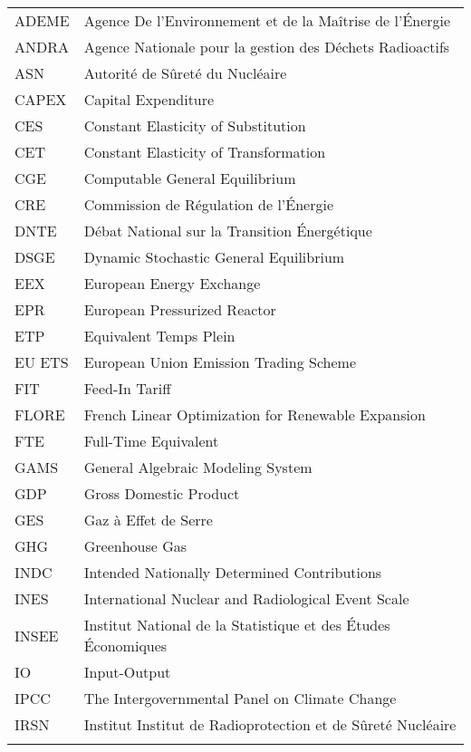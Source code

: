 \begin{tabular}{ p{} p{} }

ADEME & Agence De l'Environnement et de la Maîtrise de l'Énergie \\
ANDRA & Agence Nationale pour la gestion des Déchets Radioactifs \\
ASN & Autorité de Sûreté du Nucléaire \\
CAPEX & Capital Expenditure \\
CES & Constant Elasticity of Substitution \\
CET & Constant Elasticity of Transformation \\
CGE & Computable General Equilibrium \\
CRE & Commission de Régulation de l'Énergie \\
DNTE & Débat National sur la Transition Énergétique \\
DSGE & Dynamic Stochastic General Equilibrium \\
EEX & European Energy Exchange \\
EPR & European Pressurized Reactor \\
ETP & Equivalent Temps Plein \\
EU ETS & European Union Emission Trading Scheme \\
FIT & Feed-In Tariff \\
FLORE & French Linear Optimization for Renewable Expansion \\
FTE & Full-Time Equivalent \\
GAMS & General Algebraic Modeling System \\
GDP & Gross Domestic Product \\
GES & Gaz à Effet de Serre \\
GHG & Greenhouse Gas \\
INDC & Intended Nationally Determined Contributions \\
INES &  International Nuclear and Radiological Event Scale \\
INSEE & Institut National de la Statistique et des Études Économiques \\
IO & Input-Output \\
IPCC & The Intergovernmental Panel on Climate Change \\
IRSN & Institut Institut de Radioprotection et de Sûreté Nucléaire \\


\tabularnewline
\end{tabular}


